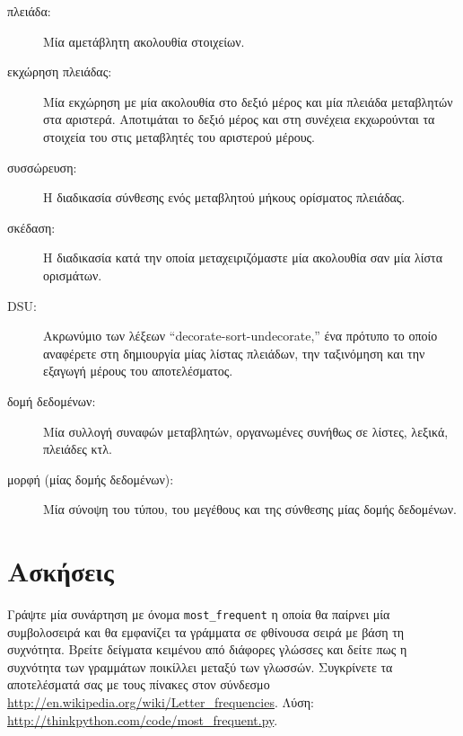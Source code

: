 \documentclass[10pt]{book}
\begin{document}
\begin{description}

\item[πλειάδα:] Μία αμετάβλητη ακολουθία στοιχείων.

\item[εκχώρηση πλειάδας:] Μία εκχώρηση με μία ακολουθία στο δεξιό μέρος και μία πλειάδα μεταβλητών στα αριστερά. Αποτιμάται το δεξιό μέρος και στη συνέχεια εκχωρούνται τα στοιχεία του στις μεταβλητές του αριστερού μέρους.

\item[συσσώρευση:] Η διαδικασία σύνθεσης ενός μεταβλητού μήκους ορίσματος πλειάδας.

\item[σκέδαση:] Η διαδικασία κατά την οποία μεταχειριζόμαστε μία ακολουθία σαν μία λίστα ορισμάτων.

\item[DSU:] Ακρωνύμιο των λέξεων ``decorate-sort-undecorate,'' ένα πρότυπο το οποίο αναφέρετε στη δημιουργία μίας λίστας πλειάδων, την ταξινόμηση και την εξαγωγή μέρους του αποτελέσματος.

\item[δομή δεδομένων:] Μία συλλογή συναφών μεταβλητών, οργανωμένες συνήθως σε λίστες, λεξικά, πλειάδες κτλ.

\item[μορφή (μίας δομής δεδομένων):] Μία σύνοψη του τύπου, του μεγέθους και της σύνθεσης μίας δομής δεδομένων.

\end{description}


\section{Ασκήσεις}

\begin{exercise}

Γράψτε μία συνάρτηση με όνομα \verb"most_frequent" η οποία θα παίρνει μία συμβολοσειρά και θα εμφανίζει τα γράμματα σε φθίνουσα σειρά με βάση τη συχνότητα. Βρείτε δείγματα κειμένου από διάφορες γλώσσες και δείτε πως η συχνότητα των γραμμάτων ποικίλλει μεταξύ των γλωσσών. Συγκρίνετε τα αποτελέσματά σας με τους πίνακες στον σύνδεσμο \url{http://en.wikipedia.org/wiki/Letter_frequencies}. Λύση: \url{http://thinkpython.com/code/most_frequent.py}.
\\

\end{exercise}
 
\end{document}
